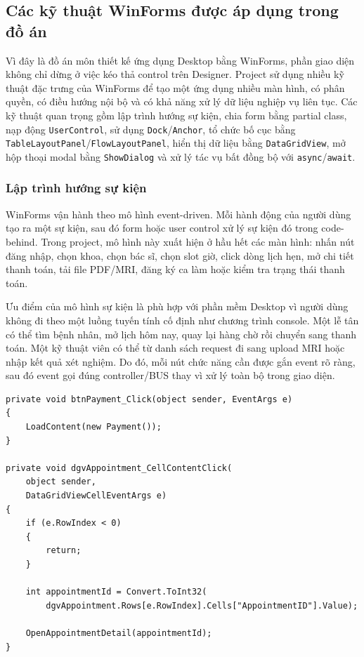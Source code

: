 \documentclass[12pt,a4paper]{article}
\numberwithin{figure}{subsection}
\numberwithin{table}{subsection}
\newcounter{codecounter}
\newenvironment{codeblock}[2]{%
    \refstepcounter{codecounter}%
    \phantomsection%
    \label{#1}%
    \par\smallskip
}{%
    \par\smallskip
}
\begin{document}
\subsection{Các kỹ thuật WinForms được áp dụng trong đồ án}

Vì đây là đồ án môn thiết kế ứng dụng Desktop bằng WinForms, phần giao diện không chỉ dừng ở việc kéo thả control trên Designer. Project sử dụng nhiều kỹ thuật đặc trưng của WinForms để tạo một ứng dụng nhiều màn hình, có phân quyền, có điều hướng nội bộ và có khả năng xử lý dữ liệu nghiệp vụ liên tục. Các kỹ thuật quan trọng gồm lập trình hướng sự kiện, chia form bằng partial class, nạp động \texttt{UserControl}, sử dụng \texttt{Dock}/\texttt{Anchor}, tổ chức bố cục bằng \texttt{TableLayoutPanel}/\texttt{FlowLayoutPanel}, hiển thị dữ liệu bằng \texttt{DataGridView}, mở hộp thoại modal bằng \texttt{ShowDialog} và xử lý tác vụ bất đồng bộ với \texttt{async}/\texttt{await}.

\subsubsection{Lập trình hướng sự kiện}

WinForms vận hành theo mô hình event-driven. Mỗi hành động của người dùng tạo ra một sự kiện, sau đó form hoặc user control xử lý sự kiện đó trong code-behind. Trong project, mô hình này xuất hiện ở hầu hết các màn hình: nhấn nút đăng nhập, chọn khoa, chọn bác sĩ, chọn slot giờ, click dòng lịch hẹn, mở chi tiết thanh toán, tải file PDF/MRI, đăng ký ca làm hoặc kiểm tra trạng thái thanh toán.

Ưu điểm của mô hình sự kiện là phù hợp với phần mềm Desktop vì người dùng không đi theo một luồng tuyến tính cố định như chương trình console. Một lễ tân có thể tìm bệnh nhân, mở lịch hôm nay, quay lại hàng chờ rồi chuyển sang thanh toán. Một kỹ thuật viên có thể từ danh sách request đi sang upload MRI hoặc nhập kết quả xét nghiệm. Do đó, mỗi nút chức năng cần được gắn event rõ ràng, sau đó event gọi đúng controller/BUS thay vì xử lý toàn bộ trong giao diện.

\begin{codeblock}{code:winform-event}{Minh họa xử lý sự kiện trong WinForms}
\begin{verbatim}
private void btnPayment_Click(object sender, EventArgs e)
{
    LoadContent(new Payment());
}

private void dgvAppointment_CellContentClick(
    object sender,
    DataGridViewCellEventArgs e)
{
    if (e.RowIndex < 0)
    {
        return;
    }

    int appointmentId = Convert.ToInt32(
        dgvAppointment.Rows[e.RowIndex].Cells["AppointmentID"].Value);

    OpenAppointmentDetail(appointmentId);
}
\end{verbatim}
\end{codeblock}
\end{document}
